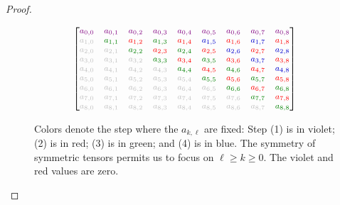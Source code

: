 \documentclass[10pt,reqno]{amsart}
\newcommand{\0}{{\color{lightgray}0}}
\renewcommand{\geq}{\geqslant}
\theoremstyle{definition}
\numberwithin{equation}{section}
\begin{document}
\begin{proof}
\begin{figure}
\begin{equation*}\footnotesize
\begin{bmatrix}
\color{violet} a_{0,0} & \color{violet}a_{0,1} & \color{violet}a_{0,2} & \color{violet}a_{0,3} & \color{violet}a_{0,4} & \color{violet}a_{0,5} & \color{violet}a_{0,6} \color{violet}& \color{violet}a_{0,7}  &\color{violet}a_{0,8} \\
 \color{lightgray}a_{1,0} & \color{green!50!black}a_{1,1} & \color{red}a_{1,2} & \color{green!50!black}a_{1,3} & \color{red}a_{1,4} & \color{blue!80!black}a_{1,5} & \color{red}a_{1,6} & \color{blue!80!black}a_{1,7} & \color{red}a_{1,8}\\
 \color{lightgray}a_{2,0} & \color{lightgray}a_{2,1} & \color{green!50!black}a_{2,2} & \color{red}a_{2,3} & \color{green!50!black}a_{2,4} & \color{red}a_{2,5} & \color{blue!80!black}a_{2,6} & \color{red}a_{2,7} & \color{blue!80!black}a_{2,8}\\
\color{lightgray} a_{3,0} & \color{lightgray}a_{3,1} & \color{lightgray}a_{3,2} & \color{green!50!black}a_{3,3} & \color{red}a_{3,4} & \color{green!50!black}a_{3,5} & \color{red}a_{3,6} & \color{blue!80!black}a_{3,7} & \color{red}a_{3,8}\\
\color{lightgray} a_{4,0} & \color{lightgray}a_{4,1} & \color{lightgray}a_{4,2} &\color{lightgray} a_{4,3} & \color{green!50!black}a_{4,4} & \color{red}a_{4,5} & \color{green!50!black}a_{4,6} & \color{red}a_{4,7} & \color{blue!80!black}a_{4,8}\\
\color{lightgray} a_{5,0} & \color{lightgray}a_{5,1} & \color{lightgray}a_{5,2} & \color{lightgray}a_{5,3} & \color{lightgray}a_{5,4} & \color{green!50!black}a_{5,5} & \color{red}a_{5,6} & \color{green!50!black}a_{5,7} & \color{red}a_{5,8}\\
\color{lightgray} a_{6,0} & \color{lightgray}a_{6,1} & \color{lightgray}a_{6,2} & \color{lightgray}a_{6,3} & \color{lightgray}a_{6,4} & \color{lightgray}a_{6,5} & \color{green!50!black}a_{6,6} & \color{red}a_{6,7} & \color{green!50!black} a_{6,8}\\
\color{lightgray} a_{7,0} & \color{lightgray}a_{7,1} & \color{lightgray}a_{7,2} & \color{lightgray}a_{7,3} & \color{lightgray}a_{7,4} & \color{lightgray}a_{7,5} & \color{lightgray}a_{7,6} & \color{green!50!black}a_{7,7}  & \color{red}a_{7,8}\\
\color{lightgray} a_{8,0} & \color{lightgray}a_{8,1} & \color{lightgray}a_{8,2} & \color{lightgray}a_{8,3} & \color{lightgray}a_{8,4} & \color{lightgray}a_{8,5} & \color{lightgray}a_{8,6} & \color{lightgray}a_{8,7}  & \color{green!50!black} a_{8,8}\\
\end{bmatrix}
\end{equation*}
\caption{Colors denote the step where the $a_{k,\ell}$ are fixed:
Step (1) is in {\color{violet}violet};
(2) is in {\color{red}red};
(3) is in {\color{green!50!black}green}; and
(4) is in {\color{blue!80!black}blue}.
The symmetry of symmetric tensors permits us to focus on $\ell \geq k \geq 0$.
The {\color{violet}violet} and {\color{red}red} values are zero.}
\label{Figure:BigMatrix}
\end{figure}



\end{proof}
\end{document}
